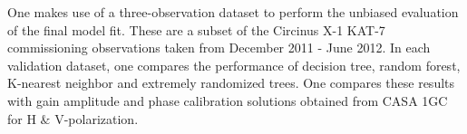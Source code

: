 One makes use of a three-observation dataset to perform the unbiased evaluation of the final model fit. These are a subset of the Circinus X-1 KAT-7 commissioning observations taken from December 2011 - June 2012. In each validation dataset, one compares the performance of decision tree, random forest, K-nearest neighbor and extremely randomized trees. One compares these results with gain amplitude and phase calibration solutions obtained from CASA 1GC for H $\&$ V-polarization. 

%
%
%
%
